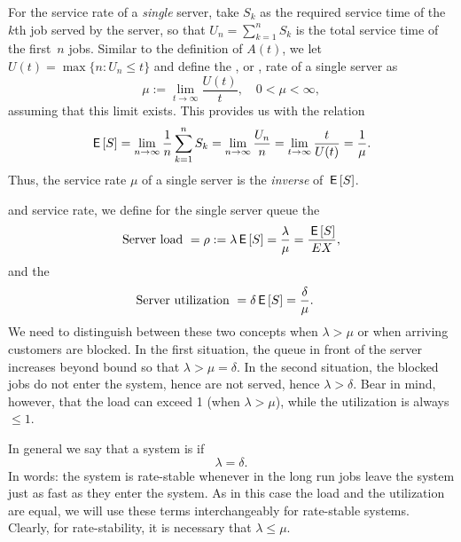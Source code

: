 \documentclass[stochastic-or.tex]{subfiles}
\begin{document}
For the service rate of a \emph{single} server, take $S_k$ as the required service time of the~$k$th job served by the server, so that $U_n = \sum_{k=1}^n S_k$ is the total service time of the first~$n$ jobs.
Similar to the definition of $A(t)$, we let $ U(t) = \max\{n: U_n \leq t\}$ and define the , or , rate of a single server as
\begin{equation*}
 \mu := \lim_{t\to\infty} \frac{U(t)}t, \quad 0 < \mu < \infty,
\end{equation*}
assuming that this limit exists. This provides us with the relation
\begin{equation*}
 \,\mathsf{E}\left[S\right] = \lim_{n\to\infty} \frac 1 n \sum_{k=1}^n S_k = \lim_{n\to\infty} \frac{U_n}{n} = \lim_{t\to\infty} \frac t{U(t)} = \frac 1 \mu.
\end{equation*}
Thus, the service rate $\mu$ of a single server is the \emph{inverse} of $\,\mathsf{E}\left[S\right]$.



 and service rate, we define for the single server queue the
\begin{align*}
\textrm{Server load } = \rho :=  \lambda \,\mathsf{E}\left[S\right]=\frac{\lambda}{\mu} = \frac{\,\mathsf{E}\left[S\right]}{E X},
\end{align*}
and the
\begin{align*}
\textrm{Server utilization } &= \delta \,\mathsf{E}\left[S\right] = \frac{\delta}{\mu}.
\end{align*}
We need to distinguish between these two concepts when $\lambda> \mu$ or when arriving customers are blocked.
In the first situation, the queue in front of the server increases beyond bound so that $\lambda > \mu = \delta$.
In the second situation, the blocked jobs do not enter the system, hence are not served, hence $\lambda > \delta$.
Bear in mind, however, that the load can exceed 1 (when $\lambda > \mu$), while the utilization is always $ \leq 1$.

In general we say that a system is  if
\begin{equation*}
\lambda = \delta.
\end{equation*}
In words: the system is rate-stable whenever in the long run jobs leave the system just as fast as they enter the system.
As in this case the load and the utilization are equal, we will use these terms interchangeably for rate-stable systems.
Clearly, for rate-stability, it is necessary that $\lambda \leq \mu$.
\end{document}
